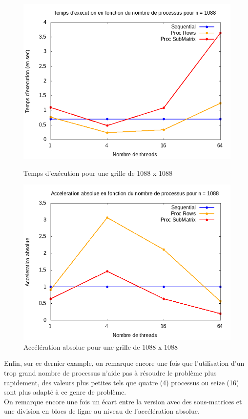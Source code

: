 \documentclass[10pt,a4paper]{article}
\begin{document}
\newpage
\begin{figure}[h]
  \centering
  \begin{minipage}[b]{0.49\textwidth}
	\includegraphics[width=\textwidth]{./Time/size_1088_time.png}
    \caption{Temps d'exécution pour une grille de 1088 x 1088}
  \end{minipage}
  \hfill
  \begin{minipage}[b]{0.49\textwidth}
    \includegraphics[width=\textwidth]{./Time/size_1088_acceleration.png}
    \caption{Accélération absolue pour une grille de 1088 x 1088}
  \end{minipage}
\end{figure}
Enfin, sur ce dernier example, on remarque encore une fois que l'utilisation d'un trop grand nombre de processus n'aide pas à résoudre le problème plus rapidement, des valeurs plus petites tels que quatre (4) processus ou seize (16) sont plus adapté à ce genre de problème. \\
On remarque encore une fois un écart entre la version avec des sous-matrices et une division en blocs de ligne au niveau de l'accélération absolue.
\end{document}
